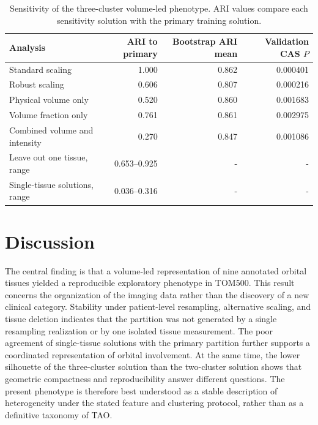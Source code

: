 \documentclass[utf8]{FrontiersinVancouver}
\begin{document}
\begin{table}
\centering
\caption{Sensitivity of the three-cluster volume-led phenotype. ARI values compare each sensitivity solution with the primary training solution.}
\label{tab:sensitivity}
\small
\begin{tabular}{lrrr}
\toprule
Analysis & ARI to primary & Bootstrap ARI mean & Validation CAS $P$\\
\midrule
Standard scaling & 1.000 & 0.862 & 0.000401\\
Robust scaling & 0.606 & 0.807 & 0.000216\\
Physical volume only & 0.520 & 0.860 & 0.001683\\
Volume fraction only & 0.761 & 0.861 & 0.002975\\
Combined volume and intensity & 0.270 & 0.847 & 0.001086\\
Leave out one tissue, range & 0.653--0.925 & - & -\\
Single-tissue solutions, range & 0.036--0.316 & - & -\\
\bottomrule
\end{tabular}
\end{table}

\section{Discussion}
The central finding is that a volume-led representation of nine annotated orbital tissues yielded a reproducible exploratory phenotype in TOM500. This result concerns the organization of the imaging data rather than the discovery of a new clinical category. Stability under patient-level resampling, alternative scaling, and tissue deletion indicates that the partition was not generated by a single resampling realization or by one isolated tissue measurement. The poor agreement of single-tissue solutions with the primary partition further supports a coordinated representation of orbital involvement. At the same time, the lower silhouette of the three-cluster solution than the two-cluster solution shows that geometric compactness and reproducibility answer different questions. The present phenotype is therefore best understood as a stable description of heterogeneity under the stated feature and clustering protocol, rather than as a definitive taxonomy of TAO.
\end{document}
